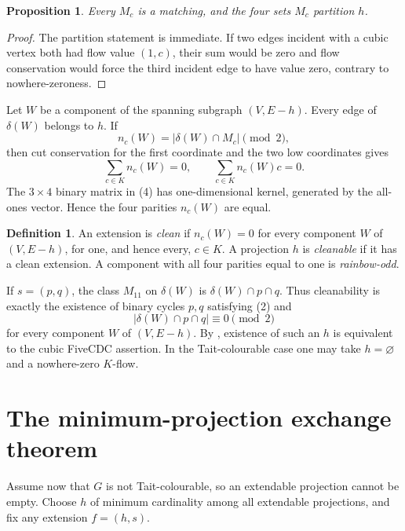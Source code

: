 \documentclass[11pt]{article}
\newtheorem{proposition}[theorem]{Proposition}
\theoremstyle{definition}
\newtheorem{definition}[theorem]{Definition}
\theoremstyle{remark}
\begin{document}
\begin{proposition}\label{prop:matching}
Every \(M_c\) is a matching, and the four sets \(M_c\) partition \(h\).
\end{proposition}

\begin{proof}
The partition statement is immediate.  If two edges incident with a cubic
vertex both had flow value \((1,c)\), their sum would be zero and flow
conservation would force the third incident edge to have value zero,
contrary to nowhere-zeroness.
\end{proof}

Let \(W\) be a component of the spanning subgraph \((V,E-h)\).  Every edge
of \(\delta(W)\) belongs to \(h\).  If
\[
                    n_c(W)=|\delta(W)\cap M_c|\pmod 2,
\]
then cut conservation for the first coordinate and the two low coordinates
gives
\[
              \sum_{c\in K}n_c(W)=0,\qquad
              \sum_{c\in K}n_c(W)c=0.                         \tag{4}
\]
The \(3\times4\) binary matrix in (4) has one-dimensional kernel, generated
by the all-ones vector.  Hence the four parities \(n_c(W)\) are equal.

\begin{definition}
An extension is \emph{clean} if \(n_c(W)=0\) for every component \(W\)
of \((V,E-h)\), for one, and hence every, \(c\in K\).
A projection \(h\) is \emph{cleanable} if it has a clean extension.
A component with all four parities equal to one is \emph{rainbow-odd}.
\end{definition}

If \(s=(p,q)\), the class \(M_{11}\) on \(\delta(W)\) is
\(\delta(W)\cap p\cap q\).  Thus cleanability is exactly the existence of
binary cycles \(p,q\) satisfying (2) and
\[
             |\delta(W)\cap p\cap q|\equiv0\pmod2             \tag{5}
\]
for every component \(W\) of \((V,E-h)\).  By
\cite[Theorem~3.16]{HusekSamal2026}, existence of such an \(h\) is
equivalent to the cubic FiveCDC assertion.  In the Tait-colourable case one
may take \(h=\varnothing\) and a nowhere-zero \(K\)-flow.

\section{The minimum-projection exchange theorem}

Assume now that \(G\) is not Tait-colourable, so an extendable projection
cannot be empty.  Choose \(h\) of minimum cardinality among all extendable
projections, and fix any extension \(f=(h,s)\).
\end{document}

